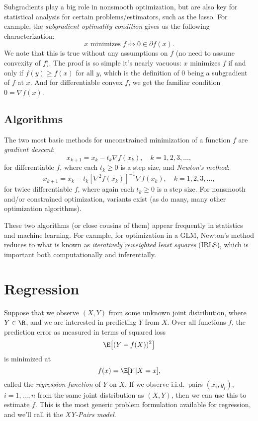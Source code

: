 \documentclass{article}
\begin{document}
Subgradients play a big role in nonsmooth optimization, but are also key for 
statistical analysis for certain problems/estimators, such as the lasso. For
example, the  \emph{subgradient optimality condition} gives us the following 
characterization:
\[
\text{$x$ minimizes $f$} \iff 0 \in \partial f(x).
\]
We note that this is true without any assumptions on $f$ (no need to assume
convexity of $f$). The proof is so simple it's nearly vacuous: $x$ minimizes $f$
if and only if $f(y) \geq f(x)$ for all $y$, which is the definition of 0 being
a subgradient of $f$ at $x$. And for differentiable convex $f$, we get the
familiar condition $0 = \nabla f(x)$.

\subsection{Algorithms}

The two most basic methods for unconstrained minimization of a function $f$ are
\emph{gradient descent}:  
\[
x_{k+1} = x_k - t_k \nabla f(x_k), \quad k=1,2,3,\dots,
\]
for differentiable $f$, where each $t_k \geq 0$ is a step size, and
\emph{Newton's method}: 
\[
x_{k+1} = x_k - t_k [\nabla^2 f(x_k)]^{-1} \nabla f(x_k), \quad k=1,2,3,\dots, 
\]
for twice differentiable $f$, where again each $t_k \geq 0$ is a step size. For
nonsmooth and/or constrained optimization, variants exist (as do many, many
other optimization algorithms). 

These two algorithms (or close cousins of them) appear frequently in statistics
and machine learning. For example, for optimization in a GLM, Newton's method 
reduces to what is known as \emph{iteratively reweighted least squares} (IRLS), 
which is important both computationally and inferentially. 

\section{Regression}

Suppose that we observe $(X,Y)$ from some unknown joint distribution, where $Y
\in \R$, and we are interested in predicting $Y$ from $X$. Over all functions
$f$, the prediction error as measured in terms of squared loss        
\[
\E\big[ (Y - f(X))^2\big]
\]
is minimized at
\[
f(x) = \E[Y | X=x], 
\]  
called the \emph{regression function} of $Y$ on $X$. If we observe i.i.d.\ pairs 
$(x_i,y_i)$, $i=1,\dots,n$ from the same joint distribution as $(X,Y)$, then we
can use this to estimate $f$. This is the most generic problem formulation 
available for regression, and we'll call it the \emph{XY-Pairs model}.  
\end{document}
